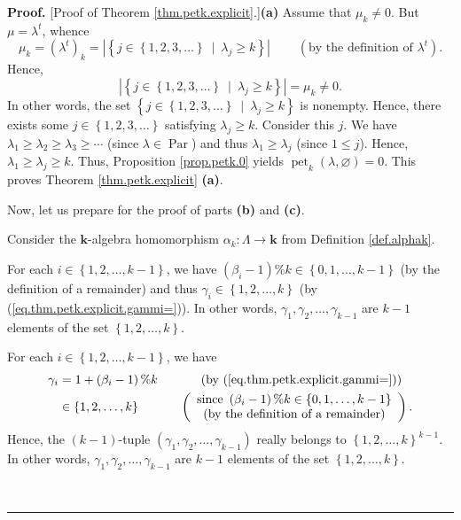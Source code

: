 \documentclass[numbers=enddot,12pt,final,onecolumn,notitlepage]{scrartcl}%
\theoremstyle{definition}
\newenvironment{proof}[1][Proof]{\noindent\textbf{#1.} }{\ \rule{0.5em}{0.5em}}
\newenvironment{verlong}{}{}
\newenvironment{vershort}{}{}
\begin{document}
\begin{proof}
[Proof of Theorem \ref{thm.petk.explicit}.]\textbf{(a)} Assume that $\mu
_{k}\neq0$. But $\mu=\lambda^{t}$, whence%
\[
\mu_{k}=\left(  \lambda^{t}\right)  _{k}=\left\vert \left\{  j\in\left\{
1,2,3,\ldots\right\}  \ \mid\ \lambda_{j}\geq k\right\}  \right\vert
\ \ \ \ \ \ \ \ \ \ \left(  \text{by the definition of }\lambda^{t}\right)  .
\]
Hence,
\[
\left\vert \left\{  j\in\left\{  1,2,3,\ldots\right\}  \ \mid\ \lambda_{j}\geq
k\right\}  \right\vert =\mu_{k}\neq0.
\]
In other words, the set $\left\{  j\in\left\{  1,2,3,\ldots\right\}
\ \mid\ \lambda_{j}\geq k\right\}  $ is nonempty. Hence, there exists some
$j\in\left\{  1,2,3,\ldots\right\}  $ satisfying $\lambda_{j}\geq k$. Consider
this $j$. We have $\lambda_{1}\geq\lambda_{2}\geq\lambda_{3}\geq\cdots$ (since
$\lambda\in\operatorname*{Par}$) and thus $\lambda_{1}\geq\lambda_{j}$ (since
$1\leq j$). Hence, $\lambda_{1}\geq\lambda_{j}\geq k$. Thus, Proposition
\ref{prop.petk.0} yields $\operatorname*{pet}\nolimits_{k}\left(
\lambda,\varnothing\right)  =0$. This proves Theorem \ref{thm.petk.explicit}
\textbf{(a)}.

Now, let us prepare for the proof of parts \textbf{(b)} and \textbf{(c)}.

Consider the $\mathbf{k}$-algebra homomorphism $\alpha_{k}:\Lambda
\rightarrow\mathbf{k}$ from Definition \ref{def.alphak}.

\begin{vershort}
For each $i\in\left\{  1,2,\ldots,k-1\right\}  $, we have $\left(  \beta
_{i}-1\right)  \%k\in\left\{  0,1,\ldots,k-1\right\}  $ (by the definition of
a remainder) and thus $\gamma_{i}\in\left\{  1,2,\ldots,k\right\}  $ (by
(\ref{eq.thm.petk.explicit.gammi=})). In other words, $\gamma_{1},\gamma
_{2},\ldots,\gamma_{k-1}$ are $k-1$ elements of the set $\left\{
1,2,\ldots,k\right\}  $.
\end{vershort}

\begin{verlong}
For each $i\in\left\{  1,2,\ldots,k-1\right\}  $, we have%
\begin{align*}
\gamma_{i}  &  =1+\left(  \beta_{i}-1\right)  \%k\ \ \ \ \ \ \ \ \ \ \left(
\text{by (\ref{eq.thm.petk.explicit.gammi=})}\right) \\
&  \in\left\{  1,2,\ldots,k\right\}  \ \ \ \ \ \ \ \ \ \ \left(
\begin{array}
[c]{c}%
\text{since }\left(  \beta_{i}-1\right)  \%k\in\left\{  0,1,\ldots,k-1\right\}
\\
\text{(by the definition of a remainder)}%
\end{array}
\right)  .
\end{align*}
Hence, the $\left(  k-1\right)  $-tuple $\left(  \gamma_{1},\gamma_{2}%
,\ldots,\gamma_{k-1}\right)  $ really belongs to $\left\{  1,2,\ldots
,k\right\}  ^{k-1}$. In other words, $\gamma_{1},\gamma_{2},\ldots
,\gamma_{k-1}$ are $k-1$ elements of the set $\left\{  1,2,\ldots,k\right\}  $.
\end{verlong}


\end{proof}
\end{document}
